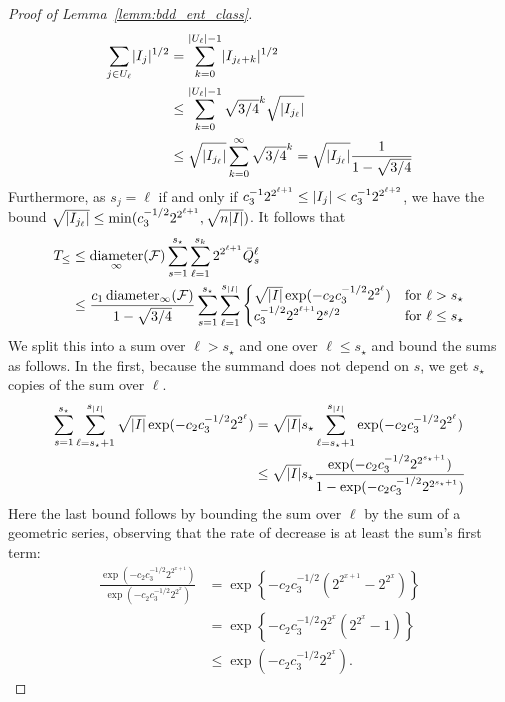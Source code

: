 \documentclass{article}
\DeclarePairedDelimiter\abs{\lvert}{\rvert}
\theoremstyle{definition}
\newcommand{\calF}{\ensuremath{\mathcal{F}}}
\DeclareMathOperator{\diameter}{diameter}
\newcommand{\diam}{\diameter}
\newcommand{\<}{\langle}
\renewcommand{\>}{\rangle}
\begin{document}
\begin{refsection}
\begin{proof}[Proof of Lemma~\ref{lemm:bdd_ent_class}]
$$
\begin{aligned}
\sum_{j \in U_{\ell}} \abs{I_j}^{1/2}
&= \sum_{k=0}^{\abs{U_{\ell}}-1} \abs{I_{j_\ell + k}}^{1/2} \\
&\le \sum_{k=0}^{\abs{U_{\ell}}-1} \sqrt{3/4}^{k} \sqrt{\abs{I_{j_\ell}}} \\
&\le \sqrt{\abs{I_{j_\ell}}}\sum_{k=0}^{\infty} \sqrt{3/4}^{k} = \sqrt{\abs{I_{j_\ell}}} \frac{1}{1-\sqrt{3/4}}
\end{aligned}
$$
Furthermore, as $s_j=\ell$ if and only if $c_3^{-1}2^{2^{\ell+1}} \le \abs{I_j} < c_3^{-1}2^{2^{\ell+2}}$, we have the bound $\sqrt{\abs{I_{j_\ell}}} \le \min(c_3^{-1/2} 2^{2^{\ell+1}}, \sqrt{n\abs{I}})$. It follows that
$$
\begin{aligned}
T_{\le}
&\le \diam_{\infty}(\calF) \sum_{s=1}^{s_\star} \sum_{\ell=1}^{s_k}  2^{2^{\ell+1}} \bar Q^\ell_s \\
&\le \frac{c_1 \diam_{\infty}(\calF) }{1-\sqrt{3/4}}  \sum_{s=1}^{s_\star} \sum_{\ell=1}^{s_{\abs{I}}}
 \begin{cases}
  \sqrt{\abs{I}} \exp(-c_2 c_3^{-1/2} 2^{2^\ell}) & \text{for} \ \ell > s_\star \\
  c_3^{-1/2} 2^{2^{\ell+1}} 2^{s/2}                          & \text{for} \ \ell \le s_\star \\
\end{cases}
\end{aligned}
$$
We split this into a sum over $\ell > s_\star$ and one over $\ell \le s_\star$ and bound the sums as follows. In the first, because the summand does not depend on $s$, we get $s_\star$ copies of the sum over $\ell$.
$$
\begin{aligned}
\sum_{s=1}^{s_\star} \sum_{\ell=s_\star+1}^{s_{\abs{I}}} \sqrt{\abs{I}} \exp(-c_2 c_3^{-1/2} 2^{2^\ell})
&=
\sqrt{\abs{I}} s_\star  \sum_{\ell=s_\star+1}^{s_{\abs{I}}} \exp(-c_2 c_3^{-1/2} 2^{2^\ell}) \\
&\le \sqrt{\abs{I}} s_\star \frac{\exp(-c_2 c_3^{-1/2} 2^{2^{s_\star+1}})}{1-\exp(-c_2 c_3^{-1/2} 2^{2^{s_\star+1}})} \\
\end{aligned}
$$
Here the last bound follows by bounding the sum over $\ell$
by the sum of a geometric series, observing that the rate of
decrease is at least the sum's first term:
$$
\begin{aligned}
\frac{\exp(-c_2 c_3^{-1/2} 2^{2^{x+1}})}{\exp(-c_2 c_3^{-1/2} 2^{2^{x}})}
&= \exp\left\{-c_2 c_3^{-1/2} (2^{2^{x+1}} - 2^{2^{x}})\right\} \\
&= \exp\left\{-c_2 c_3^{-1/2} 2^{2^{x}}(2^{2^{x}} - 1)\right\}  \\
&\le \exp(-c_2 c_3^{-1/2} 2^{2^{x}}).
\end{aligned}
$$


\end{proof}
\end{refsection}
\end{document}
